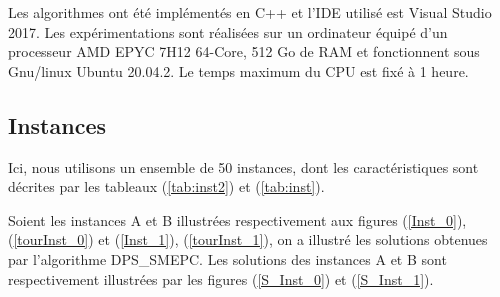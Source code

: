 Les algorithmes ont été implémentés en C++ et l'IDE utilisé est Visual Studio 2017. Les expérimentations sont réalisées sur un ordinateur équipé d'un processeur AMD EPYC 7H12 64-Core, 512 Go de RAM et
fonctionnent sous Gnu/linux Ubuntu 20.04.2. Le temps maximum du CPU est fixé à 1 heure.

\subsection{Instances}
Ici, nous utilisons un ensemble de 50 instances, dont les caractéristiques sont décrites par les tableaux (\ref{tab:inst2}) et (\ref{tab:inst}).

Soient les instances A et B illustrées respectivement aux figures (\ref{Inst_0}), (\ref{tourInst_0}) et (\ref{Inst_1}), (\ref{tourInst_1}), on a illustré les solutions obtenues par l'algorithme DPS\_SMEPC. Les solutions des instances A et B sont respectivement illustrées par les figures (\ref{S_Inst_0}) et (\ref{S_Inst_1}).

